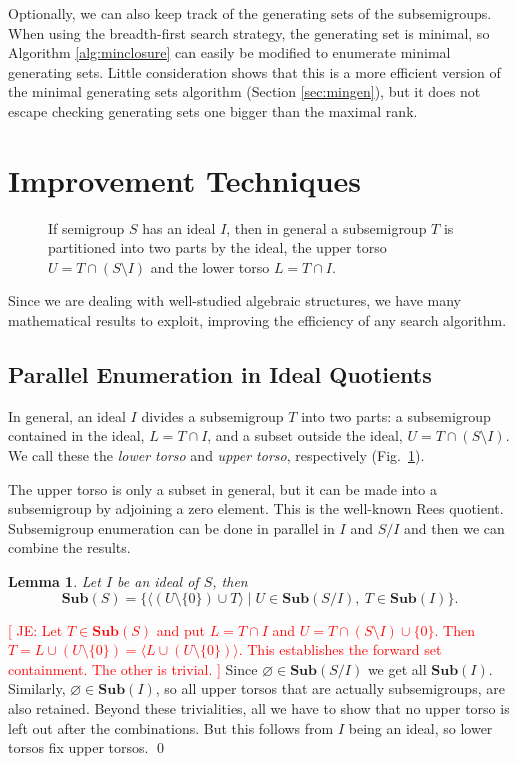 \documentclass{amsart}
\newcommand{\Sub}{\mathbf{Sub}}
\newcommand{\todo}[1]{\textcolor{red}{ \small \textsf{[ #1 ]} \normalsize}}
\theoremstyle{plain}
\newtheorem{lemma}[theorem]{Lemma}
\theoremstyle{definition}
\begin{document}
Optionally, we can also keep track of the generating sets of the subsemigroups.
When using the breadth-first search strategy, the generating set is minimal, so Algorithm \ref{alg:minclosure} can easily be modified to enumerate minimal generating sets.
Little consideration shows that this is a more efficient version of the minimal generating sets algorithm (Section \ref{sec:mingen}), but it does not escape checking generating sets one bigger than the maximal rank.

\section{Improvement Techniques}
\label{sec:techniques}

\begin{figure}[t]
\begin{center}

\caption{If semigroup $S$ has an ideal $I$, then in general a subsemigroup $T$ is partitioned into two parts by the ideal, the upper torso $U=T\cap (S\setminus I)$ and the lower torso $L=T\cap I$.}
\label{fig:torsos}
\end{center}
\end{figure}

Since we are dealing with well-studied algebraic structures, we have many mathematical results to exploit, improving the efficiency of any  search algorithm.
\subsection{Parallel Enumeration in Ideal Quotients}
\label{sec:idealparallel}
In general, an ideal $I$ divides a subsemigroup $T$ into two parts: a subsemigroup contained in the ideal, $L=T\cap I$, and a subset outside the ideal, $U=T\cap (S\setminus I)$. We call these the \emph{lower torso} and \emph{upper torso}, respectively (Fig.\ \ref{fig:torsos}).

The upper torso is only a subset in general, but it can be made into a subsemigroup by adjoining a zero element. This is the well-known Rees quotient. 
Subsemigroup enumeration can be done in parallel in $I$ and $S/I$  and then  we can combine the results.

\begin{lemma}
\label{lem:torso}
Let $I$ be an ideal of $S$, then $$\Sub(S)=\big\{\langle (U\setminus\{0\})\cup T \rangle\mid U\in \Sub(S/I),\ T\in\Sub(I)\big\}.$$
\end{lemma}
\proof
\todo{JE: Let $T\in\Sub(S)$ and put $L=T\cap I$ and $U=T\cap(S\setminus I)\cup\{0\}$. Then $T=L\cup(U\setminus \{0\})=\langle L\cup(U\setminus\{0\})\rangle$. This establishes the forward set containment. The other is trivial.}
Since $\varnothing \in \Sub(S/I)$ we get all $\Sub(I)$.
Similarly, $\varnothing \in \Sub(I)$, so all upper torsos that are actually subsemigroups, are also retained.
Beyond these trivialities, all we have to show that no upper torso is left out after the combinations.
But this follows from $I$ being an ideal, so lower torsos fix upper torsos.
\qed
\end{document}
